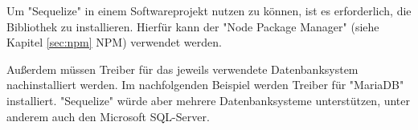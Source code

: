 
Um "Sequelize" in einem Softwareprojekt nutzen zu können, ist es erforderlich, die Bibliothek zu installieren. Hierfür kann der "Node Package Manager" (siehe Kapitel \ref{sec:npm} NPM) verwendet werden. \cite{Sequelize}


Außerdem müssen Treiber für das jeweils verwendete Datenbanksystem nachinstalliert werden. Im nachfolgenden Beispiel werden Treiber für "MariaDB" installiert. "Sequelize" würde aber mehrere Datenbanksysteme unterstützen, unter anderem auch den Microsoft SQL-Server. \cite{SequInstall}

